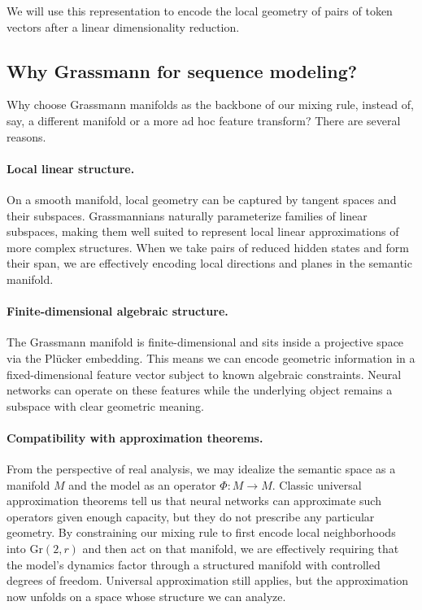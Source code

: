 \documentclass[11pt]{article}
\newcommand{\Gr}{\mathrm{Gr}}
\begin{document}
We will use this representation to encode the local geometry of pairs of token vectors after a linear dimensionality reduction.

\subsection{Why Grassmann for sequence modeling?}

Why choose Grassmann manifolds as the backbone of our mixing rule, instead of, say, a different manifold or a more ad hoc feature transform? There are several reasons.

\paragraph{Local linear structure.}
On a smooth manifold, local geometry can be captured by tangent spaces and their subspaces. Grassmannians naturally parameterize families of linear subspaces, making them well suited to represent local linear approximations of more complex structures. When we take pairs of reduced hidden states and form their span, we are effectively encoding local directions and planes in the semantic manifold.

\paragraph{Finite-dimensional algebraic structure.}
The Grassmann manifold is finite-dimensional and sits inside a projective space via the Pl\"ucker embedding. This means we can encode geometric information in a fixed-dimensional feature vector subject to known algebraic constraints. Neural networks can operate on these features while the underlying object remains a subspace with clear geometric meaning.

\paragraph{Compatibility with approximation theorems.}
From the perspective of real analysis, we may idealize the semantic space as a manifold $M$ and the model as an operator $\Phi : M \to M$. Classic universal approximation theorems tell us that neural networks can approximate such operators given enough capacity, but they do not prescribe any particular geometry. By constraining our mixing rule to first encode local neighborhoods into $\Gr(2,r)$ and then act on that manifold, we are effectively requiring that the model's dynamics factor through a structured manifold with controlled degrees of freedom. Universal approximation still applies, but the approximation now unfolds on a space whose structure we can analyze.
\end{document}
